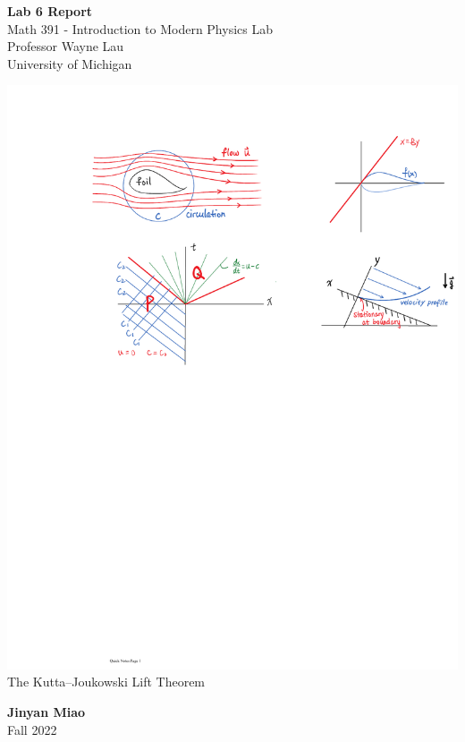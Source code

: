 \documentclass[11pt]{book}
\theoremstyle{break}
\theoremstyle{break}
\begin{document}
	\begin{titlepage}
		\begin{center}
			\vspace*{1cm}
			\Huge \color{red}
				\textbf{Lab 6 Report}\\
			\vspace{0.5cm}			
			\Large \color{black}
				Math 391 - Introduction to Modern Physics Lab\\
				Professor Wayne Lau\\	
				University of Michigan\\
			\vspace{3cm}

			\includegraphics[scale=1.29]{circulation.pdf}\\
			\color{gray}The Kutta–Joukowski Lift Theorem\color{black}
			
			
			\vspace{5cm}
			\LARGE
				\textbf{Jinyan Miao}\\
				\hfill\break
				\LARGE Fall 2022\\
			\vspace{1cm}

		\vspace*{\fill}
		\end{center}			
	\end{titlepage}
\end{document}
